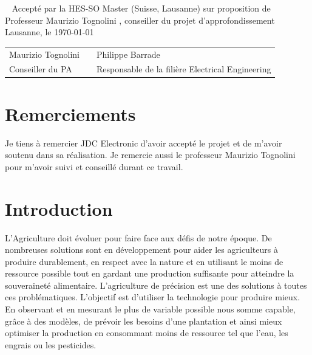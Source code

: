 \documentclass[a4paper, french, 10pt]{article} %
\newcommand{\prof}{Maurizio Tognolini }
\begin{document}


\newpage
\thispagestyle{empty}
\
\newpage
\thispagestyle{empty}
Accepté par la HES-SO Master (Suisse, Lausanne) sur proposition de\\[10pt]
Professeur \prof, conseiller du projet d'approfondissement\\[30pt]
Lausanne, le \today\\[40pt]

\begin{tabular}{lll}
\prof & \hspace{4cm} & Philippe Barrade\\
Conseiller du PA & \hspace{4cm} & Responsable de la filière Electrical Engineering\\
\end{tabular}

\newpage
\thispagestyle{empty}
\section*{Remerciements}
Je tiens à remercier JDC Electronic d'avoir accepté le projet et de m'avoir soutenu dans sa réalisation. Je remercie aussi le professeur \prof pour m'avoir suivi et conseillé durant ce travail.

\newpage
\thispagestyle{empty}
\tableofcontents

\newpage

\section{Introduction}
L'Agriculture doit évoluer pour faire face aux défis de notre époque. De nombreuses solutions sont en développement pour aider les agriculteurs à produire durablement, en respect avec la nature et en utilisant le moins de ressource possible tout en gardant une production suffisante pour atteindre la souveraineté alimentaire. L'agriculture de précision est une des solutions à toutes ces problématiques. L'objectif est d'utiliser la technologie pour produire mieux. En observant et en mesurant le plus de variable possible nous somme capable, grâce à des modèles, de prévoir les besoins d'une plantation et ainsi mieux optimiser la production en consommant moins de ressource tel que l'eau, les engrais ou les pesticides. 
\end{document}
